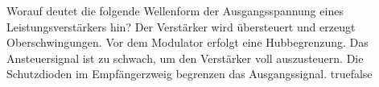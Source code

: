     {Worauf deutet die folgende Wellenform der Ausgangsspannung eines Leistungsverstärkers hin?}
    {Der Verstärker wird übersteuert und erzeugt Oberschwingungen.}
    {Vor dem Modulator erfolgt eine Hubbegrenzung.}
    {Das Ansteuersignal ist zu schwach, um den Verstärker voll auszusteuern.}
    {Die Schutzdioden im Empfängerzweig begrenzen das Ausgangssignal.}
    {true}{false}